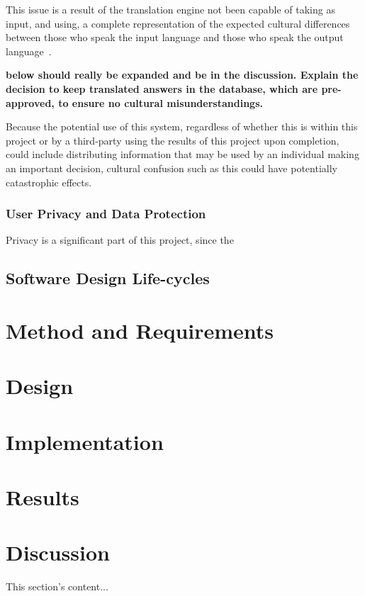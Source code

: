 \documentclass{article}
\begin{document}
This issue is a result of the translation engine not been capable of taking as input, and using, a complete representation of the expected cultural differences between those who speak the input language and those who speak the output language~\cite{melby2006can}.

{\bf below should really be expanded and be in the discussion.  Explain the decision to keep translated answers in the database, which are pre-approved, to ensure no cultural misunderstandings.}

Because the potential use of this system, regardless of whether this is within this project or by a third-party using the results of this project upon completion, could include distributing information that may be used by an individual making an important decision, cultural confusion such as this could have potentially catastrophic effects.

\subsubsection{User Privacy and Data Protection}
Privacy is a significant part of this project, since the

\subsection{Software Design Life-cycles}

\newpage
\section{Method and Requirements}
\label{sec:method}

\newpage
\section{Design}
\label{sec:design}

\newpage
\section{Implementation}
\label{sec:implementation}

\newpage
\section{Results}
\label{sec:results}

\newpage
\section{Discussion}
\label{sec:discussion}
This section's content...
\end{document}
